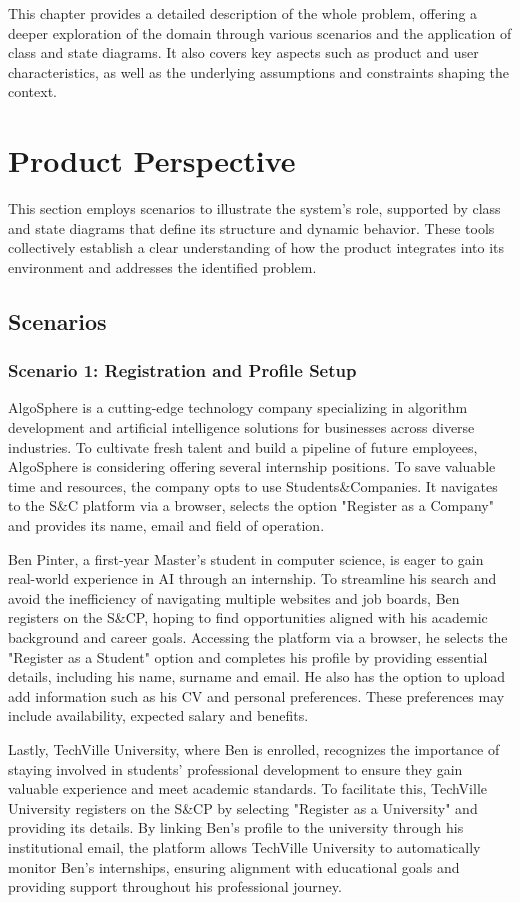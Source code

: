 This chapter provides a detailed description of the whole problem, offering a deeper exploration of the domain through various scenarios and the application of class and state diagrams.
It also covers key aspects such as product and user characteristics, as well as the underlying assumptions and constraints shaping the context.

\section{Product Perspective}
This section employs scenarios to illustrate the system's role, supported by class and state diagrams that define its structure and dynamic behavior.
These tools collectively establish a clear understanding of how the product integrates into its environment and addresses the identified problem.

\subsection{Scenarios}
\subsubsection{Scenario 1: Registration and Profile Setup}
AlgoSphere is a cutting-edge technology company specializing in algorithm development and artificial intelligence solutions for businesses across diverse industries.
To cultivate fresh talent and build a pipeline of future employees, AlgoSphere is considering offering several internship positions.
To save valuable time and resources, the company opts to use Students\&Companies.
It navigates to the S\&C platform via a browser, selects the option "Register as a Company"
and provides its name, email and field of operation.

Ben Pinter, a first-year Master's student in computer science, is eager to gain real-world experience in AI through an internship.
To streamline his search and avoid the inefficiency of navigating multiple websites and job boards, Ben registers on the S\&CP, hoping to find opportunities aligned with his academic background and career goals.
Accessing the platform via a browser, he selects the "Register as a Student" option and completes his profile by providing essential details, including his name, surname and email.
He also has the option to upload add information such as his CV and personal preferences.
These preferences may include availability, expected salary and benefits.

Lastly, TechVille University, where Ben is enrolled, recognizes the importance of staying involved in students’ professional development to ensure they gain valuable experience and meet academic standards.
To facilitate this, TechVille University registers on the S\&CP by selecting "Register as a University" and providing its details. By linking Ben’s profile to the university through his institutional email, the platform allows TechVille University to automatically monitor Ben’s internships, ensuring alignment with educational goals and providing support throughout his professional journey.

